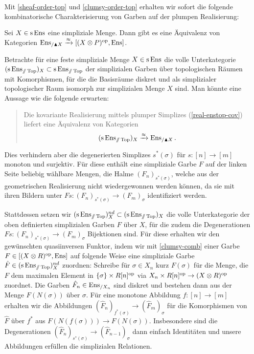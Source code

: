 Mit \ref{sheaf-order-top} und \ref{clumsy-order-top} erhalten wir
sofort die folgende kombinatorische Charakterisierung von Garben auf
der plumpen Realisierung:
\begin{prop} \label{clumsy-comb}
  Sei $X \in \operatorname{s}\operatorname{Ens}$ eine simpliziale Menge. Dann gibt es eine
  Äquivalenz von Kategorien $\operatorname{Ens}_{/\blacktriangle X} \xrightarrow{\approx} [(X
    \otimes P)^\mathrm{op}, \operatorname{Ens}]$.
\end{prop}

\begin{bem}
  Betrachte für eine feste simpliziale Menge $X \in \operatorname{s}\operatorname{Ens}$ die volle
  Unterkategorie $(\operatorname{s}\operatorname{Ens}_{\mathbin{/\mkern-6mu/} \operatorname{Top}})_X \subset \operatorname{s}\operatorname{Ens}_{\mathbin{/\mkern-6mu/} \operatorname{Top}}$ der
  simplizialen Garben über topologischen Räumen mit Komorphismen, für
  die die Basisräume diskret und als simplizialer topologischer Raum
  isomorph zur simplizialen Menge $X$ sind. Man könnte eine Aussage
  wie die folgende erwarten:
  \begin{quote}
    Die kovariante Realisierung mittels plumper Simplizes
    (\ref{real-enstop-cov}) liefert eine Äquivalenz von Kategorien
    \[ (\operatorname{s}\operatorname{Ens}_{\mathbin{/\mkern-6mu/} \operatorname{Top}})_X \xrightarrow{\approx} \operatorname{Ens}_{/\blacktriangle X}. \]
  \end{quote}
  Dies verhindern aber die degenerierten Simplizes $s^*(\sigma)$ für
  $s: [n] \to [m]$ monoton und surjektiv. Für diese enthält eine
  simpliziale Garbe $F$ auf der linken Seite beliebig wählbare Mengen,
  die Halme $(F_n)_{s^*(\sigma)}$, welche aus der geometrischen
  Realisierung nicht wiedergewonnen werden können, da sie mit ihren
  Bildern unter $Fs: (F_n)_{s^*(\sigma)} \to (F_m)_\sigma$
  identifiziert werden.

  Stattdessen setzen wir $(\operatorname{s}\operatorname{Ens}_{\mathbin{/\mkern-6mu/} \operatorname{Top}})_X^{nd} \subset
  (\operatorname{s}\operatorname{Ens}_{\mathbin{/\mkern-6mu/} \operatorname{Top}})_X$ die volle Unterkategorie der oben definierten
  simplizialen Garben $F$ über $X$, für die zudem die Degenerationen
  $Fs: (F_n)_{s^*(\sigma)} \to (F_m)_\sigma$ Bijektionen sind. Für
  diese erhalten wir den gewünschten quasiinversen Funktor, indem wir
  mit \ref{clumsy-comb} einer Garbe $F \in [(X \otimes R)^\mathrm{op}, \operatorname{Ens}]$
  auf folgende Weise eine simpliziale Garbe $\hat{F} \in
  (\operatorname{s}\operatorname{Ens}_{\mathbin{/\mkern-6mu/} \operatorname{Top}})_X^{nd}$ zuordnen: Schreibe für $\sigma \in X_n$ kurz
  $F(\sigma)$ für die Menge, die $F$ dem maximalen Element in
  $\{\sigma\} \times R[n]^\mathrm{op}$ via $X_n \times R[n]^\mathrm{op} \to (X \otimes
  R)^\mathrm{op}$ zuordnet. Die Garben $\hat{F}_n \in \operatorname{Ens}_{/X_n}$ sind diskret
  und bestehen dann aus der Menge $F(N(\sigma))$ über $\sigma$. Für
  eine monotone Abbildung $f: [n] \to [m]$ erhalten wir die
  Abbildungen $(\hat{F}_n)_{f^*(\sigma)} \to (\hat{F}_{m})_\sigma$ für
  die Komorphismen von $\hat{F}$ über $f^*$ aus $F(N(f(\sigma))) \to
  F(N(\sigma))$. Insbesondere sind die Degenerationen
  $(\hat{F}_n)_{s^*(\sigma)} \to (\hat{F}_{n-1})_\sigma$ dann einfach
  Identitäten und unsere Abbildungen erfüllen die simplizialen
  Relationen.
\end{bem}

